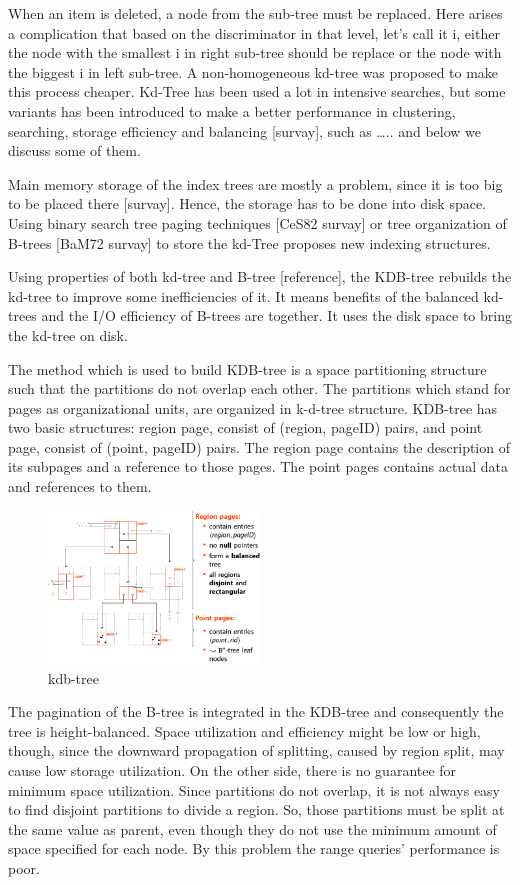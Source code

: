 \documentclass[a4paper,12pt]{article}
\begin{document}
When an item is deleted, a node from the sub-tree must be replaced. Here arises a complication that based on the discriminator in that level, let's call it i, either the node with the smallest i in right sub-tree should be replace or  the node with the biggest i in left sub-tree. A non-homogeneous kd-tree was proposed to make this process cheaper. 
Kd-Tree has been used a lot in intensive searches, but some variants has been introduced to make a better performance in clustering, searching, storage efficiency and balancing [survay], such as …..
and below we discuss some of them.

Main memory storage of the index trees are mostly a problem, since it is too big to be placed there  [survay]. Hence, the storage has to be done into disk space. Using binary search tree paging techniques [CeS82 survay] or tree organization of B-trees [BaM72 survay] to store the kd-Tree proposes new indexing structures.

Using properties of both kd-tree and B-tree [reference], the KDB-tree rebuilds the kd-tree to improve some inefficiencies of it.  It means benefits of the balanced kd-trees and the I/O efficiency of B-trees are together. It uses the disk space to bring the kd-tree on disk. 

The method which is used to build  KDB-tree is a space partitioning structure such that the partitions do not overlap each other. The partitions which stand for pages as organizational units, are organized in k-d-tree structure. 
KDB-tree has two basic structures: region page, consist of (region, pageID) pairs, and point page, consist of  (point, pageID) pairs. The region page contains the description of its subpages and a reference to those pages. The point pages contains actual data and references to them. 

\begin{figure}
\centering
\includegraphics[width=0.5\textwidth]{kdbtree}
\caption{kdb-tree}
\label{figkdbtree}
\end{figure}

The pagination of the B-tree is integrated in the KDB-tree and consequently the tree is height-balanced. Space utilization and efficiency might be low or high, though, since the downward propagation of splitting, caused by region split, may cause low storage utilization. On the other side, there is no guarantee for minimum space utilization. Since partitions do not overlap, it is not always easy to find disjoint partitions to divide a region. So, those partitions must be split at the same value as parent, even though they do not use the minimum amount of space specified for each node. By this problem the range queries' performance is poor. 
\end{document}
